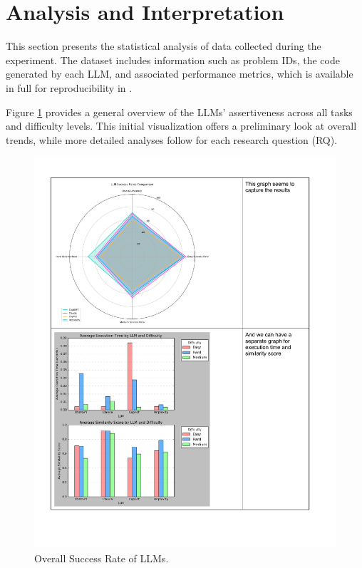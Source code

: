 \documentclass[conference]{IEEEtran}
\begin{document}
\section{Analysis and Interpretation} \label{sec:analysis}

This section presents the statistical analysis of data collected during the experiment. The dataset includes information such as problem IDs, the code generated by each LLM, and associated performance metrics, which is available in full for reproducibility in \cite{EASER_LLM4Code_Study4_2023}.

Figure \ref{fig:fig1} provides a general overview of the LLMs' assertiveness across all tasks and difficulty levels. This initial visualization offers a preliminary look at overall trends, while more detailed analyses follow for each research question (RQ).


\begin{figure}[!ht]
    \centering
    \includegraphics[width=0.95\linewidth]{figures/results/graph-overall.pdf}
    \caption{Overall Success Rate of LLMs.}
    \label{fig:fig1}
\end{figure}
\end{document}
